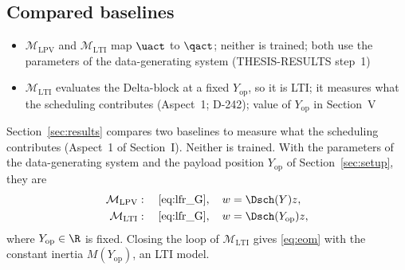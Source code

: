 \subsection{Compared baselines}\label{sec:baselines}
\ifdraft
\begin{itemize}
\item $\mathcal M_{\mathrm{LPV}}$ and $\mathcal M_{\mathrm{LTI}}$ map $\uact$ to $\qact$; neither is trained; both use the parameters of the data-generating system (THESIS-RESULTS step~1)
\item $\mathcal M_{\mathrm{LTI}}$ evaluates the Delta-block at a fixed $Y_{\mathrm{op}}$, so it is LTI; it measures what the scheduling contributes (Aspect~1; D-242); value of $Y_{\mathrm{op}}$ in Section~V
\end{itemize}
\fi
Section~\ref{sec:results} compares two baselines to measure what the
scheduling contributes (Aspect~1 of Section~I).
Neither is trained.
With the parameters of the data-generating system and the payload position
$Y_{\mathrm{op}}$ of Section~\ref{sec:setup}, they are
\begin{equation}
\begin{aligned}
  \mathcal M_{\mathrm{LPV}}&:\quad\eqref{eq:lfr_G},\quad w=\Dsch(Y)z,\\
  \mathcal M_{\mathrm{LTI}}&:\quad\eqref{eq:lfr_G},\quad w=\Dsch(Y_{\mathrm{op}})z,
\end{aligned}
\label{eq:baselines}
\end{equation}
where $Y_{\mathrm{op}}\in\R$ is fixed.
Closing the loop of $\mathcal M_{\mathrm{LTI}}$ gives \eqref{eq:eom} with the
constant inertia $M(Y_{\mathrm{op}})$, an LTI model.
